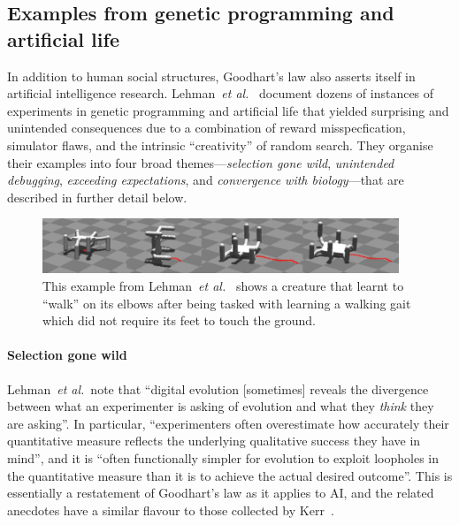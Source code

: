 \documentclass[11pt]{article}
\newcommand{\etal}{{\em et al.}\ }
\begin{document}
\subsection{Examples from genetic programming and artificial life}

In addition to human social structures, Goodhart's law also asserts itself in
artificial intelligence research.
%
Lehman~\etal\cite{lehman18surprising} document dozens of instances of
experiments in genetic programming and artificial life that yielded surprising
and unintended consequences due to a combination of reward misspecfication,
simulator flaws, and the intrinsic ``creativity'' of random search.
%
They organise their examples into four broad themes---\textit{selection gone
wild}, \textit{unintended debugging}, \textit{exceeding expectations}, and
\textit{convergence with biology}---that are described in further detail below.

\begin{figure}
  \begin{center}
    \includegraphics[width=0.95\textwidth]{figures/elbow-walking-robot.png}
  \end{center}
  \vspace{-1em}
  \caption{
    This example from Lehman~\etal\cite{lehman18surprising} shows a creature
    that learnt to ``walk'' on its elbows after being tasked with learning a
    walking gait which did not require its feet to touch the ground.
  }
  \label{fig:elbows}
\end{figure}

\paragraph{Selection gone wild}
%
Lehman~\etal note that ``digital evolution [sometimes] reveals the divergence
between what an experimenter is asking of evolution and what they \textit{think}
they are asking''.
%
In particular, ``experimenters often overestimate how accurately their
quantitative measure reflects the underlying qualitative success they have in
mind'', and it is ``often functionally simpler for evolution to exploit
loopholes in the quantitative measure than it is to achieve the actual desired
outcome''.
%
This is essentially a restatement of Goodhart's law as it applies to AI, and the
related anecdotes have a similar flavour to those collected by
Kerr~\cite{kerr75folly}.
\end{document}
